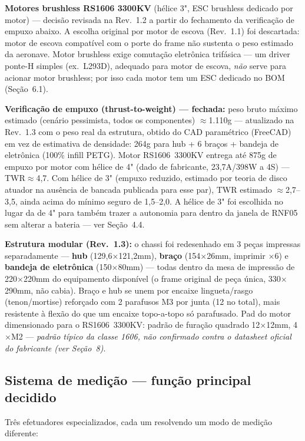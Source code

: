 \documentclass[11pt,a4paper]{article}
\newcommand{\statusok}{\textcolor{voltok}{\textbf{decidido}}}
\newcommand{\destaque}[2]{%
  \par\noindent\colorbox{voltbandbg}{%
    \begin{minipage}{\dimexpr\linewidth-2\fboxsep\relax}
      \vspace{0.3em}
      \textcolor{voltcyan}{\textbf{#1}} #2
      \vspace{0.3em}
    \end{minipage}%
  }\par\vspace{1em}
}
\begin{document}
\textbf{Motores brushless RS1606 3300KV} (hélice 3", ESC brushless dedicado por motor) — decisão revisada na Rev.~1.2 a partir do fechamento da verificação de empuxo abaixo. A escolha original por motor de escova (Rev.~1.1) foi descartada: motor de escova compatível com o porte do frame não sustenta o peso estimado da aeronave. Motor brushless exige comutação eletrônica trifásica — um driver ponte-H simples (ex.\ L293D), adequado para motor de escova, \emph{não} serve para acionar motor brushless; por isso cada motor tem um ESC dedicado no BOM (Seção~6.1).

\destaque{Verificação de empuxo (thrust-to-weight) — fechada:}{peso bruto máximo estimado (cenário pessimista, todos os componentes) $\approx$1.110g — atualizado na Rev.~1.3 com o peso real da estrutura, obtido do CAD paramétrico (FreeCAD) em vez de estimativa de densidade: 264g para hub + 6 braços + bandeja de eletrônica (100\% infill PETG). Motor RS1606~3300KV entrega até 875g de empuxo por motor com hélice de 4" (dado de fabricante, 23,7A/398W a 4S) — TWR$\approx$4,7. Com hélice de 3" (empuxo reduzido, estimado por teoria de disco atuador na ausência de bancada publicada para esse par), TWR estimado $\approx$2,7--3,5, ainda acima do mínimo seguro de 1,5--2,0. A hélice de 3" foi escolhida no lugar da de 4" para também trazer a autonomia para dentro da janela de RNF05 sem alterar a bateria — ver Seção~4.4.}

\textbf{Estrutura modular (Rev.~1.3):} o chassi foi redesenhado em 3 peças impressas separadamente — \textbf{hub} (129,6$\times$121,2mm), \textbf{braço} (154$\times$26mm, imprimir $\times$6) e \textbf{bandeja de eletrônica} (150$\times$80mm) — todas dentro da mesa de impressão de 220$\times$220mm do equipamento disponível (o frame original de peça única, 330$\times$290mm, não cabia). Braço e hub se unem por encaixe lingueta/rasgo (tenon/mortise) reforçado com 2 parafusos M3 por junta (12 no total), mais resistente à flexão do que um encaixe topo-a-topo só parafusado. Pad do motor dimensionado para o RS1606~3300KV: padrão de furação quadrado 12$\times$12mm, 4$\times$M2 — \emph{padrão típico da classe 1606, não confirmado contra o datasheet oficial do fabricante (ver Seção~8)}.

\subsection{Sistema de medição — função principal \normalfont\statusok}

Três efetuadores especializados, cada um resolvendo um modo de medição diferente:
\end{document}

